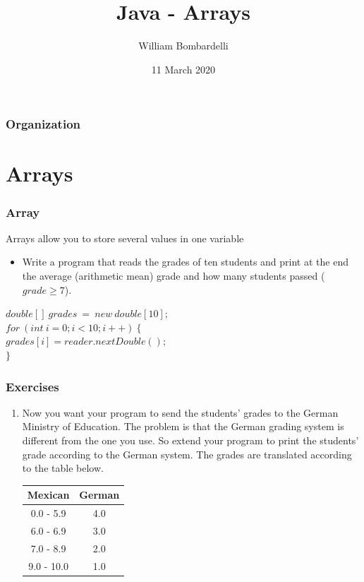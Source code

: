 \documentclass{beamer}
\title[Java]{Java - Arrays}
\author[W. Bombardelli]{William Bombardelli}
\institute[Schweizerschule Mexiko]
{
	\vskip 12pt
	Schweizerschule Mexiko, Ciudad de México, Mexico \\
	\texttt{\url{https://github.com/wbombardellis/java-unterricht}}
}
\date{11 March 2020}
\newcommand{\cindent}{\hskip20pt}
\begin{document}
	\begin{frame}
		\titlepage
	\end{frame}
	
	\begin{frame}
		\frametitle{Organization}
		\tableofcontents
	\end{frame}

	\section{Arrays}
	\begin{frame}
		\frametitle{Array}
		Arrays allow you to store several values in one variable
		\pause
		\begin{itemize}
			\item Write a program that reads the grades of ten students and print at the end the average (arithmetic mean) grade and how many students passed ($grade \ge 7$).
		\end{itemize}
		\pause
		$double[]\ grades\ =\ new\ double[10];$\\
		$for\ (int\ i = 0; i < 10; i++)\ \{$\\
			\cindent $grades[i] = reader.nextDouble();$\\
		$\}$\\
	\end{frame}

	\begin{frame}
		\frametitle{Exercises}
		\begin{enumerate}
			\item Now you want your program to send the students' grades to the German Ministry of Education. The problem is that the German grading system is different from the one you use. So extend your program to print the students' grade according to the German system. The grades are translated according to the table below.\\
			\centering
			\begin{tabular}{c | c}
				Mexican 	& German \\
				\hline
				0.0 - 5.9	& 4.0 \\
				6.0 - 6.9	& 3.0 \\
				7.0 - 8.9	& 2.0 \\
				9.0 - 10.0	& 1.0 \\
			\end{tabular}
		\end{enumerate}
	\end{frame}
\end{document}
